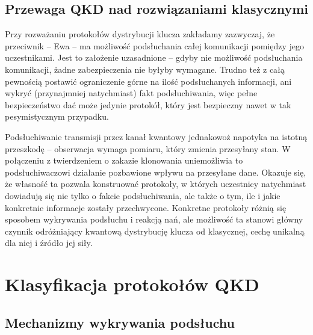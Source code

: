 \documentclass[10pt]{article}
\begin{document}

\subsection{Przewaga QKD nad rozwiązaniami klasycznymi}

Przy rozważaniu protokołów dystrybucji klucza zakładamy zazwyczaj, że przeciwnik -- Ewa -- ma możliwość
podsłuchania całej komunikacji pomiędzy jego uczestnikami. Jest to założenie uzasadnione -- gdyby nie
możliwość podsłuchania komunikacji, żadne zabezpieczenia nie byłyby wymagane. Trudno też z całą 
pewnością postawić ograniczenie górne na ilość podsłuchanych informacji, ani wykryć (przynajmniej
natychmiast) fakt podsłuchiwania, więc pełne bezpieczeństwo dać może jedynie protokół, który jest 
bezpieczny nawet w tak pesymistycznym przypadku. 

Podsłuchiwanie transmisji przez kanał kwantowy jednakowoż napotyka na istotną przeszkodę -- obserwacja
wymaga pomiaru, który zmienia przesyłany stan. W połączeniu z twierdzeniem o zakazie klonowania 
uniemożliwia to podsłuchiwaczowi działanie pozbawione wpływu na przesyłane dane. Okazuje się, że własność
ta pozwala konstruować protokoły, w których uczestnicy natychmiast dowiadują się nie tylko o fakcie
podsłuchiwania, ale także o tym, ile i jakie konkretnie informacje zostały przechwycone. Konkretne 
protokoły różnią się sposobem wykrywania podsłuchu i reakcją nań, ale możliwość ta stanowi główny 
czynnik odróżniający kwantową dystrybucję klucza od klasycznej, cechę unikalną dla niej i źródło jej 
siły.

\section{Klasyfikacja protokołów QKD}

\subsection{Mechanizmy wykrywania podsłuchu}
\end{document}
